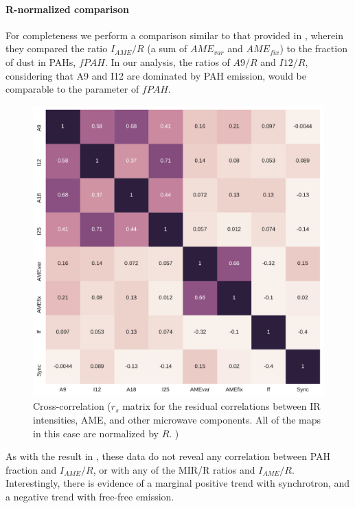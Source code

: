         \paragraph{R-normalized comparison}
            For completeness we perform a comparison similar to that provided in \cite{hensley16}, wherein they compared the ratio $I_{AME}/R$ (a sum of $AME_{var}$ and $AME_{fix}$) to the fraction of dust in PAHs, $fPAH$. In our analysis, the ratios of $A9/R$ and $I12/R$, considering that A9 and I12 are dominated by PAH emission, would be comparable to the \cite{hensley16} parameter of $fPAH$.
                \begin{figure}
                    \includegraphics[width=\textwidth/2]{../Plots/ch_allsky/all_bands_corr_matrix_wAME_spearmanR_norm_masked_hens.pdf}
                    \centering
                    \caption{Cross-correlation ($r_{s}$ matrix for the residual correlations between IR intensities, AME, and other microwave components. All of the maps in this case are normalized by $R$. )}
                    \label{fig:all_bands_corr_matrix_wAME_spearmanR_norm_masked_hens}
                \end{figure}
            As with the result in \cite{hensley16}, these data do not reveal any correlation between PAH fraction and $I_{AME}/R$, or with any of the MIR/R ratios and $I_{AME}/R$. Interestingly, there is evidence of a marginal positive trend with synchrotron, and a negative trend with free-free emission.


